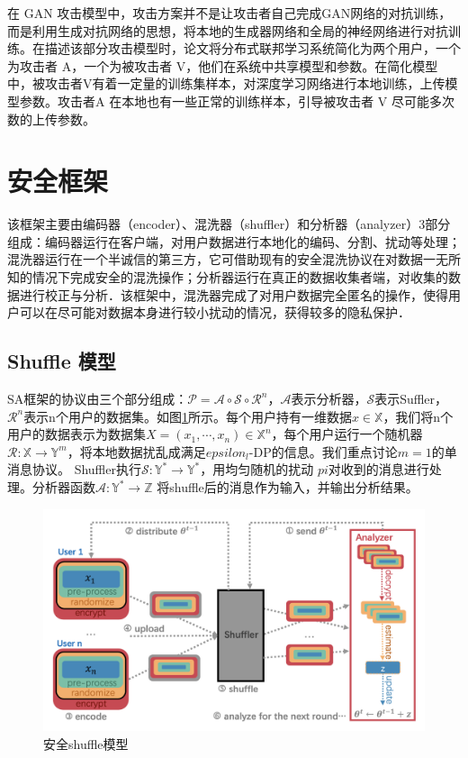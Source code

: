 在 GAN 攻击模型中，攻击方案并不是让攻击者自己完成GAN网络的对抗训练，而是利用生成对抗网络的思想，将本地的生成器网络和全局的神经网络进行对抗训练。在描述该部分攻击模型时，论文将分布式联邦学习系统简化为两个用户，一个为攻击者 A，一个为被攻击者 V，他们在系统中共享模型和参数。在简化模型中，被攻击者V有着一定量的训练集样本，对深度学习网络进行本地训练，上传模型参数。攻击者A 在本地也有一些正常的训练样本，引导被攻击者 V 尽可能多次数的上传参数。 


\section{安全框架}
该框架主要由编码器（encoder）、混洗器（shuffler）和分析器（analyzer）3部分组成：编码器运行在客户端，对用户数据进行本地化的编码、分割、扰动等处理；混洗器运行在一个半诚信的第三方，它可借助现有的安全混洗协议\cite{ref40}\cite{ref41}\cite{ref42}\cite{ref43}\cite{ref44}\cite{ref45}\cite{ref46}在对数据一无所知的情况下完成安全的混洗操作；分析器运行在真正的数据收集者端，对收集的数据进行校正与分析．该框架中，混洗器完成了对用户数据完全匿名的操作，使得用户可以在尽可能对数据本身进行较小扰动的情况，获得较多的隐私保护． 

\subsection{Shuffle 模型}
SA框架的协议由三个部分组成：$\mathcal{P}=\mathcal{A} \circ \mathcal{S} \circ \mathcal{R}^{n}$，$\mathcal{A}$表示分析器，$\mathcal{S}$表示Suffler，$\mathcal{R}^{n}$表示n个用户的数据集。如图\ref{fig:shuffle模型}所示。每个用户持有一维数据$x \in \mathbb{X}$，我们将n个用户的数据表示为数据集$X=\left(x_{1}, \cdots, x_{n}\right) \in \mathbb{X}^{n}$，每个用户运行一个随机器$\mathcal{R}: \mathbb{X} \rightarrow \mathbb{Y}^{m}$，将本地数据扰乱成满足$epsilon_{l}$-DP的信息。我们重点讨论$m=1$的单消息协议。 Shuffler执行$\mathcal{S}: \mathbb{Y}^{*} \rightarrow \mathbb{Y}^{*}$，用均匀随机的扰动 $pi$对收到的消息进行处理。分析器函数$\mathcal{A}: \mathbb{Y}^{*} \rightarrow \mathbb{Z}$ 将shuffle后的消息作为输入，并输出分析结果。

\begin{figure}[!hbt]
\centering
  \includegraphics[scale=0.4]{fig2/C4/shuffle模型}%
  \caption{安全shuffle模型}
  \label{fig:shuffle模型} 
\end{figure}

